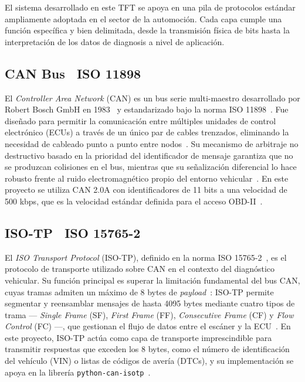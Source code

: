 El sistema desarrollado en este TFT se apoya en una pila de protocolos estándar 
ampliamente adoptada en el sector de la automoción. Cada capa cumple una función 
específica y bien delimitada, desde la transmisión física de bits hasta la 
interpretación de los datos de diagnosis a nivel de aplicación.


\subsection{CAN Bus \textemdash\ ISO 11898}

El \textit{Controller Area Network} (CAN) es un bus serie multi-maestro desarrollado 
por Robert Bosch GmbH en 1983~\cite{Bosch91-can} y estandarizado bajo la norma 
ISO 11898~\cite{ISO11898-1-15}. Fue diseñado para permitir la comunicación entre 
múltiples unidades de control electrónico (ECUs) a través de un único par de cables 
trenzados, eliminando la necesidad de cableado punto a punto entre 
nodos~\cite{Bosch91-can}. Su mecanismo de arbitraje no destructivo basado en la 
prioridad del identificador de mensaje garantiza que no se produzcan colisiones en el 
bus, mientras que su señalización diferencial lo hace robusto frente al ruido 
electromagnético propio del entorno vehicular~\cite{ISO11898-1-15}. En este proyecto 
se utiliza CAN 2.0A con identificadores de 11 bits a una velocidad de 500 kbps, que 
es la velocidad estándar definida para el acceso OBD-II~\cite{SAE-J1979-12}.


\subsection{ISO-TP \textemdash\ ISO 15765-2}

El \textit{ISO Transport Protocol} (ISO-TP), definido en la norma 
ISO 15765-2~\cite{ISO15765-2-16}, es el protocolo de transporte utilizado sobre CAN 
en el contexto del diagnóstico vehicular. Su función principal es superar la 
limitación fundamental del bus CAN, cuyas tramas admiten un máximo de 8 bytes de 
\textit{payload}~\cite{ISO11898-1-15}: ISO-TP permite segmentar y reensamblar 
mensajes de hasta 4095 bytes mediante cuatro tipos de trama --- \textit{Single Frame} 
(SF), \textit{First Frame} (FF), \textit{Consecutive Frame} (CF) y \textit{Flow 
Control} (FC) ---, que gestionan el flujo de datos entre el escáner y la 
ECU~\cite{ISO15765-2-16}. En este proyecto, ISO-TP actúa como capa de transporte 
imprescindible para transmitir respuestas que exceden los 8 bytes, como el número de 
identificación del vehículo (VIN) o listas de códigos de avería (DTCs), y su 
implementación se apoya en la librería 
\texttt{python-can-isotp}~\cite{Menager23-isotp}.



